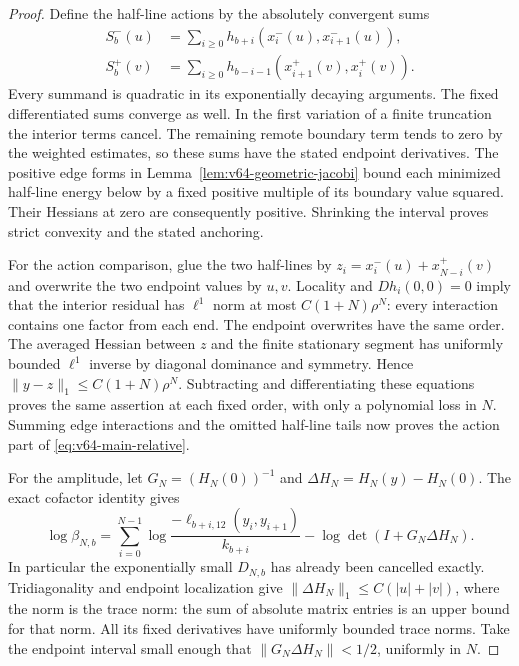 \begin{proof}
Define the half-line actions by the absolutely convergent sums
\begin{equation}\label{eq:v64-half-actions}
 \begin{split}
 S_b^-(u)&=\sum_{i\ge0}h_{b+i}(x_i^-(u),x_{i+1}^-(u)),\\
 S_b^+(v)&=\sum_{i\ge0}h_{b-i-1}(x_{i+1}^+(v),x_i^+(v)).
 \end{split}
\end{equation}
Every summand is quadratic in its exponentially decaying arguments.
The fixed differentiated sums converge as well.  In the first variation
of a finite truncation the interior terms cancel.  The remaining remote
boundary term tends to zero by the weighted estimates, so these sums
have the stated endpoint derivatives.  The positive edge forms in
Lemma~\ref{lem:v64-geometric-jacobi} bound each minimized half-line
energy below by a fixed positive multiple of its boundary value squared.
Their Hessians at zero are consequently positive.  Shrinking the interval
proves strict convexity and the stated anchoring.

For the action comparison, glue the two half-lines by
$z_i=x_i^-(u)+x_{N-i}^+(v)$ and overwrite the two endpoint values by
$u,v$.  Locality and $Dh_i(0,0)=0$ imply that the interior residual
has $\ell^1$ norm at most $C(1+N)\rho^N$: every interaction contains
one factor from each end.  The endpoint overwrites have the same order.
The averaged Hessian between $z$ and the finite stationary segment has
uniformly bounded $\ell^1$ inverse by diagonal dominance and symmetry.
Hence $\|y-z\|_1\le C(1+N)\rho^N$.  Subtracting and differentiating
these equations proves the same assertion at each fixed order, with
only a polynomial loss in $N$.  Summing edge interactions and the
omitted half-line tails now proves the action part of
\eqref{eq:v64-main-relative}.

For the amplitude, let $G_N=(H_N(0))^{-1}$ and
$\Delta H_N=H_N(y)-H_N(0)$.  The exact cofactor identity gives
\begin{equation}\label{eq:v64-relative-log}
 \log\beta_{N,b}=
 \sum_{i=0}^{N-1}\log\frac{-\ell_{b+i,12}(y_i,y_{i+1})}{k_{b+i}}
            -\log\det(I+G_N\Delta H_N).
\end{equation}
In particular the exponentially small $D_{N,b}$ has already been
cancelled exactly.  Tridiagonality and endpoint localization give
$\|\Delta H_N\|_1\le C(|u|+|v|)$, where the norm is the trace norm:
the sum of absolute matrix entries is an upper bound for that norm.
All its fixed derivatives have uniformly bounded trace norms.
Take the endpoint interval small enough that
$\|G_N\Delta H_N\|<1/2$, uniformly in $N$.


\end{proof}
